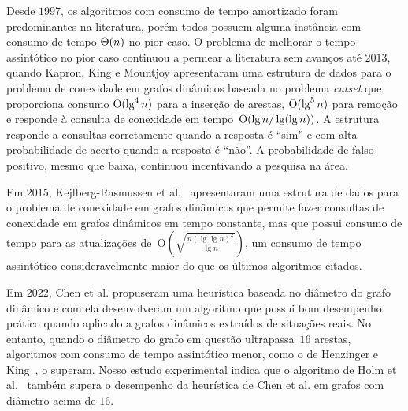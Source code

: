 Desde $1997$, os algoritmos com consumo de tempo amortizado foram predominantes na literatura, porém todos possuem alguma instância com consumo de tempo $\Theta(n)$ no pior caso.
O problema de melhorar o tempo assintótico no pior caso continuou a permear a literatura sem avanços até $2013$, quando Kapron, King e Mountjoy \cite{bruceM} apresentaram uma estrutura de dados para o problema de conexidade em grafos dinâmicos baseada no problema \textit{cutset} que proporciona consumo $\mathrm{O}(\lg^4 n)$ para a inserção de arestas, $\mathrm{O}(\lg^5 n)$ para remoção e responde à consulta de conexidade em tempo~$\mathrm{O}(\lg n / \lg(\lg n))$.
A estrutura responde a consultas corretamente quando a resposta é “sim” e com alta probabilidade de acerto quando a resposta é “não”. A probabilidade de falso positivo, mesmo que baixa, continuou incentivando a pesquisa na área. 

Em $2015$, Kejlberg-Rasmussen et al.~\cite{kejlbergrasmussen_et_al} apresentaram uma estrutura de dados para o problema de conexidade em grafos dinâmicos que permite fazer consultas de conexidade em grafos dinâmicos em tempo constante, mas que possui consumo de tempo para as atualizações de~$\mathrm{O}\!\left(\sqrt{\frac{n\left(\lg \lg n\right)^2}{\lg n}}\right)$, um consumo de tempo assintótico consideravelmente maior do que os últimos algoritmos citados.

Em $2022$, Chen et al. \cite{QC22} propuseram uma heurística baseada no diâmetro do grafo dinâmico e com ela desenvolveram um algoritmo que possui bom desempenho prático quando aplicado a grafos dinâmicos extraídos de situações reais.
No entanto, quando o diâmetro do grafo em questão ultrapassa~$16$ arestas, algoritmos com consumo de tempo assintótico menor, como o de Henzinger e King~\cite{HenzingerKing}, o superam.
Nosso estudo experimental indica que o algoritmo de Holm et al.~\cite{poly_log} também supera o desempenho da heurística de Chen et al. em grafos com diâmetro acima de $16$.
